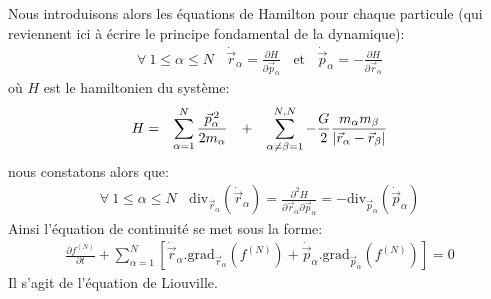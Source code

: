 Nous introduisons alors les équations de Hamilton pour chaque particule (qui reviennent ici à écrire le principe fondamental de la dynamique):
\begin{align*}
	\forall~1\leq\alpha\leq N~~~~\dot{\vec{r}}_{\alpha}=\frac{\partial H}{\partial\vec{p}_{\alpha}}~~~~\text{et}~~~~\dot{\vec{p}}_{\alpha
	}=-\frac{\partial H}{\partial\vec{r}_{\alpha}}
\end{align*}
où $H$ est le hamiltonien du système:
\begin{align*}
	\begin{array}[c]{cccc}
		H= & \displaystyle\sum\limits_{\alpha=1}^{N}\dfrac{\vec{p}_{\alpha}^{\,2}}{2m_{\alpha}} & + & \displaystyle\sum\limits_{\alpha\neq\beta=1}^{N,N}%
		-\dfrac{G}{2}\dfrac{m_{\alpha}m_{\beta}}{\left\vert \vec{r}_{\alpha}-\vec{r}_{\beta}\right\vert }%
	\end{array}
\end{align*}
nous constatons alors que:
\begin{align*}
	\forall~1\leq\alpha\leq N~~~~\mathrm{div}_{\vec{r}_{\alpha}}\left(\dot{\vec{r}}_{\alpha}\right)  =\frac{\partial^{2}H}{\partial
	\vec{r}_{\alpha}\partial\vec{p}_{\alpha}}=-\mathrm{div}_{\vec{p}_{\alpha}}\left(  \dot{\vec{p}}_{\alpha}\right)
\end{align*}
Ainsi l'équation de continuité se met sous la forme:
\begin{align}
	\frac{\partial f^{(N)}}{\partial t}+\sum_{\alpha=1}^{N}\left[  \dot{\vec{r}}_{\alpha}.\mathrm{grad}_{\vec{r}_{\alpha}}\left(  f^{(N)}\right)
	+\dot{\vec{p}}_{\alpha}.\mathrm{grad}_{\vec{p}_{\alpha}}\left(f^{(N)}\right)  \right]  =0\label{liouville}%
\end{align}
Il s'agit de l'équation de Liouville.

